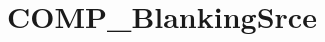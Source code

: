 \hypertarget{group___c_o_m_p___blanking_srce}{\section{C\-O\-M\-P\-\_\-\-Blanking\-Srce}
\label{group___c_o_m_p___blanking_srce}
}
